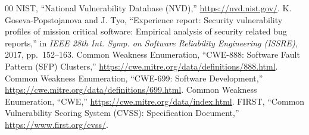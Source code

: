 \documentclass[conference]{IEEEtran}
\begin{document}
\begin{thebibliography}{00}
 NIST, ``National Vulnerability Database (NVD),''
  \url{https://nvd.nist.gov/}.
 K. Goseva-Popstojanova and J. Tyo, ``Experience report:
  Security vulnerability profiles of mission critical software: Empirical
  analysis of security related bug reports,'' in \emph{IEEE 28th Int. Symp. on
  Software Reliability Engineering (ISSRE)}, 2017, pp.~152--163.
 Common Weakness Enumeration, ``CWE-888: Software Fault
  Pattern (SFP) Clusters,''
  \url{https://cwe.mitre.org/data/definitions/888.html}.
 Common Weakness Enumeration, ``CWE-699: Software
  Development,'' \url{https://cwe.mitre.org/data/definitions/699.html}.
 Common Weakness Enumeration, ``CWE,''
  \url{https://cwe.mitre.org/data/index.html}.
 FIRST, ``Common Vulnerability Scoring System (CVSS):
  Specification Document,'' \url{https://www.first.org/cvss/}.
\end{thebibliography}
\end{document}

